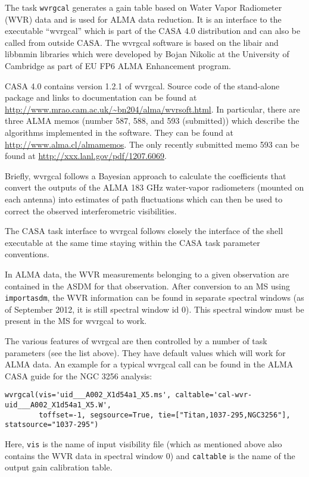 The task {\tt wvrgcal} generates a gain table based on Water Vapor
Radiometer (WVR) data and is used for ALMA data reduction. It is an
interface to the executable ``wvrgcal'' which is part of the CASA 4.0
distribution and can also be called from outside CASA. The wvrgcal
software is based on the libair and libbnmin libraries which were
developed by Bojan Nikolic at the University of Cambridge as part of
EU FP6 ALMA Enhancement program.

CASA 4.0 contains version 1.2.1 of wvrgcal. Source code of the
stand-alone package and links to documentation can be found at
\url{http://www.mrao.cam.ac.uk/\~bn204/alma/wvrsoft.html}. In
particular, there are three ALMA memos (number 587, 588, and 593
(submitted)) which describe the algorithms implemented in the
software. They can be found at \url{http://www.alma.cl/almamemos}.
The only recently submitted memo 593 can be found at
\url{http://xxx.lanl.gov/pdf/1207.6069}.

Briefly, wvrgcal follows a Bayesian approach to calculate the
coefficients that convert the outputs of the ALMA 183 GHz water-vapor
radiometers (mounted on each antenna) into estimates of path
fluctuations which can then be used to correct the observed
interferometric visibilities.

The CASA task interface to wvrgcal follows closely the interface of
the shell executable at the same time staying within the CASA task
parameter conventions.

In ALMA data, the WVR measurements belonging to a given observation
are contained in the ASDM for that observation. After conversion to an
MS using {\tt importasdm}, the WVR information can be found in
separate spectral windows (as of September 2012, it is still spectral
window id 0).  This spectral window must be present in the MS for
wvrgcal to work.

The various features of wvrgcal are then controlled by a number of
task parameters (see the list above).  They have default values which
will work for ALMA data.  An example for a typical wvrgcal call can be
found in the ALMA CASA guide for the NGC 3256 analysis:

\small
\begin{verbatim}
wvrgcal(vis='uid___A002_X1d54a1_X5.ms', caltable='cal-wvr-uid___A002_X1d54a1_X5.W',  
        toffset=-1, segsource=True, tie=["Titan,1037-295,NGC3256"], statsource="1037-295")
\end{verbatim}
\normalsize

Here, {\tt vis} is the name of input visibility file (which as
mentioned above also contains the WVR data in spectral window 0) and
{\tt caltable} is the name of the output gain calibration table.

